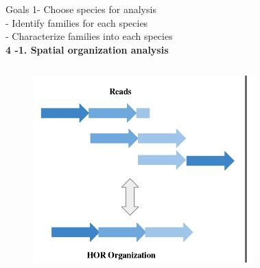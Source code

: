 \documentclass[11pt]{beamer}
\begin{document}
\begin{frame}{Goals}
	1- Choose species for analysis \\  - Identify families for each species \\  - Characterize families into each species \\ \medbreak
	\textbf{4 -1.  Spatial organization analysis} \\ \medbreak
		\begin{columns}
		\begin{figure}
			\includegraphics[width=\textwidth]{img/HOR.png}
		\end{figure}		
		\begin{figure}

\end{figure}
\end{columns}
\end{frame}
\end{document}
